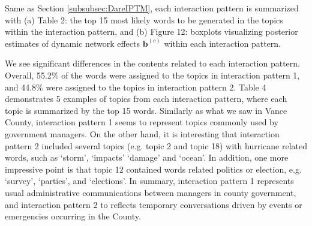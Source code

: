 \documentclass[a4paper]{article}
\begin{document}
          	Same as Section \ref{subsubsec:DareIPTM}, each interaction pattern is summarized with (a) Table 2: the top 15 most likely words to be generated in the topics within the interaction pattern, and (b)  Figure 12: boxplots visualizing posterior estimates of dynamic network effects $\boldsymbol{b}^{(c)}$ within each interaction pattern.
          	
          		We see significant differences in the contents related to each interaction pattern. Overall, 55.2\% of the words were assigned to the topics in interaction pattern 1, and 44.8\% were assigned to the topics in interaction pattern 2. Table 4 demonstrates 5 examples of topics from each interaction pattern, where each topic is summarized by the top 15 words. Similarly as what we saw in Vance County, interaction pattern 1 seems to represent topics commonly used by government managers. On the other hand, it is interesting that interaction pattern 2 included several topics (e.g. topic 2 and topic 18) with hurricane related words, such as `storm', `impacts' `damage' and `ocean'. In addition, one more impressive point is that topic 12 contained words related politics or election, e.g. `survey', `parties', and `elections'. In summary, interaction pattern 1 represents usual administrative communications between managers in county government, and interaction pattern 2 to reflects temporary conversations driven by events or emergencies occurring in the County.
\end{document}
